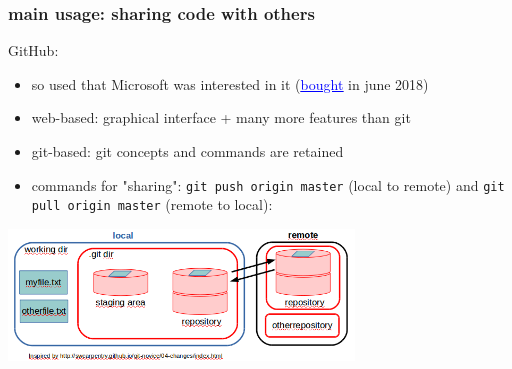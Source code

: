 \begin{frame}[containsverbatim]
\frametitle{ main usage: sharing code with others}
\begin{block}{GitHub:}
\begin{itemize}
    \item so used that Microsoft was interested in it (\href{https://blogs.microsoft.com/blog/2018/06/04/microsoft-github-empowering-developers/}{\textcolor{blue}{\underline{bought}}} in june 2018)
    \item web-based: graphical interface + many more features than git
    \item git-based: git concepts and commands are retained
    \item commands for "sharing": \verb|git push origin master| (local to remote) and \verb|git pull origin master| (remote to local):
\end{itemize}
\begin{center}
\includegraphics[height=3.5cm]{05_history/Images/FAIR_git_pushpull.png}
\end{center}
\end{block}
\end{frame}
